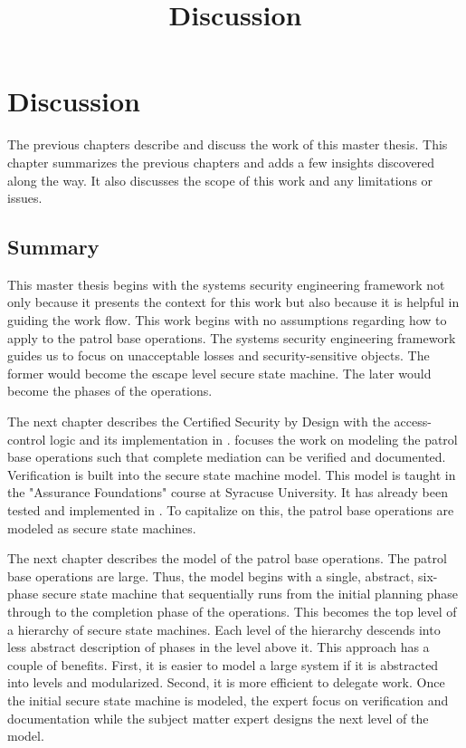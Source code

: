 \documentclass[../../main/main.tex]{subfiles}
\begin{document}
\title{Discussion}

\chapter{Discussion}\label{chp:discussion}

The previous chapters describe and discuss the work of this master thesis. This chapter summarizes the previous chapters and adds a few insights discovered along the way.  It also discusses the scope of this work and any limitations or issues.  

\section{Summary}\label{recap}
This master thesis begins with the systems security engineering framework not only because it presents the context for this work but also because it is helpful in guiding the work flow.  This work begins with no assumptions regarding how to apply  to the patrol base operations.  The systems security engineering framework guides us to focus on unacceptable losses and security-sensitive objects.  The former would become the escape level secure state machine.  The later would become the phases of the operations.  

The next chapter describes the Certified Security by Design with the access-control logic and its implementation in .   focuses the work on modeling the patrol base operations such that complete mediation can be verified and documented.  Verification is built into the secure state machine model.  This model is taught in the "Assurance Foundations" course at Syracuse University.  It has already been tested and implemented in .  To capitalize on this, the patrol base operations are modeled as secure state machines.   

The next chapter describes the model of the patrol base operations.  The patrol base operations are large.  Thus, the model begins with a  single, abstract, six-phase secure state machine that sequentially runs from the initial planning phase through to the completion phase of the operations.  This becomes the top level of a hierarchy of secure state machines.  Each level of the hierarchy descends into less abstract description of  phases in the level above it.  This approach has a couple of benefits.  First, it is easier to model a large system if it is abstracted into levels and modularized.  Second, it is more efficient to delegate work.  Once the initial secure state machine is modeled, the  expert focus on verification and documentation while the subject matter expert designs the next level of the model.
\end{document}
